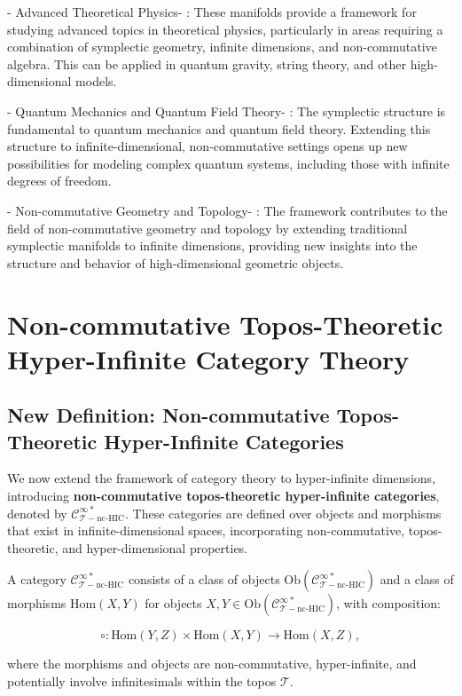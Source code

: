 \documentclass{article}
\begin{document}
-  Advanced Theoretical Physics- : These manifolds provide a framework for studying advanced topics in theoretical physics, particularly in areas requiring a combination of symplectic geometry, infinite dimensions, and non-commutative algebra. This can be applied in quantum gravity, string theory, and other high-dimensional models.

-  Quantum Mechanics and Quantum Field Theory- : The symplectic structure is fundamental to quantum mechanics and quantum field theory. Extending this structure to infinite-dimensional, non-commutative settings opens up new possibilities for modeling complex quantum systems, including those with infinite degrees of freedom.

-  Non-commutative Geometry and Topology- : The framework contributes to the field of non-commutative geometry and topology by extending traditional symplectic manifolds to infinite dimensions, providing new insights into the structure and behavior of high-dimensional geometric objects.


\section{Non-commutative Topos-Theoretic Hyper-Infinite Category Theory}
\subsection{New Definition: Non-commutative Topos-Theoretic Hyper-Infinite Categories}
We now extend the framework of category theory to hyper-infinite dimensions, introducing \textbf{non-commutative topos-theoretic hyper-infinite categories}, denoted by \(\mathcal{C}_{\mathcal{T}-\text{nc-HIC}}^{\infty *}\). These categories are defined over objects and morphisms that exist in infinite-dimensional spaces, incorporating non-commutative, topos-theoretic, and hyper-dimensional properties.

A category \(\mathcal{C}_{\mathcal{T}-\text{nc-HIC}}^{\infty *}\) consists of a class of objects \(\text{Ob}(\mathcal{C}_{\mathcal{T}-\text{nc-HIC}}^{\infty *})\) and a class of morphisms \(\text{Hom}(X, Y)\) for objects \(X, Y \in \text{Ob}(\mathcal{C}_{\mathcal{T}-\text{nc-HIC}}^{\infty *})\), with composition:

\[
\circ : \text{Hom}(Y, Z) \times \text{Hom}(X, Y) \to \text{Hom}(X, Z),
\]

where the morphisms and objects are non-commutative, hyper-infinite, and potentially involve infinitesimals within the topos \(\mathcal{T}\).
\end{document}
